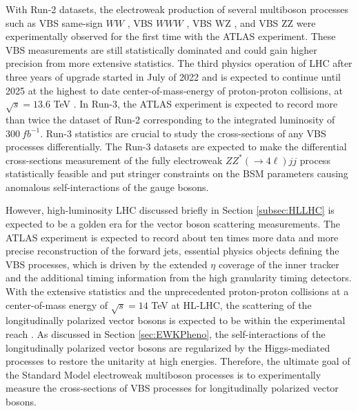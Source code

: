 With Run-2 datasets, the electroweak production of several multiboson processes such as VBS same-sign $WW$ \cite{EWk_ssWW}, VBS $WWW$ \cite{EWK_WWW}, VBS WZ \cite{EWK_WZ}, and VBS ZZ \cite{ATLASZZjj} were experimentally observed for the first time with the ATLAS experiment. These VBS measurements are still statistically dominated and could gain higher precision from more extensive statistics. The third physics operation of LHC after three years of upgrade started in July of 2022 and is expected to continue until 2025 at the highest to date center-of-mass-energy of proton-proton collisions, at $\sqrt{s}=13.6$ TeV \cite{Run3}. In Run-3, the ATLAS experiment is expected to record more than twice the dataset of Run-2 corresponding to the integrated luminosity of $300 ~fb^{-1}$. Run-3 statistics are crucial to study the cross-sections of any VBS processes differentially. The Run-3 datasets are expected to make the differential cross-sections measurement of the fully electroweak $ZZ^*(\rightarrow 4\ell) jj$ process statistically feasible and put stringer constraints on the BSM parameters causing anomalous self-interactions of the gauge bosons. 

However, high-luminosity LHC discussed briefly in Section \ref{subsec:HLLHC} is expected to be a golden era for the vector boson scattering measurements. The ATLAS experiment is expected to record about ten times more data and more precise reconstruction of the forward jets, essential physics objects defining the VBS processes, which is driven by the extended $\eta$ coverage of the inner tracker and the additional timing information from the high granularity timing detectors. With the extensive statistics and the unprecedented proton-proton collisions at a center-of-mass energy of $\sqrt{s}=14$ TeV at HL-LHC, the scattering of the longitudinally polarized vector bosons is expected to be within the experimental reach \cite{ssWW_HLLHCProspects}. As discussed in Section \ref{sec:EWKPheno}, the self-interactions of the longitudinally polarized vector bosons are regularized by the Higgs-mediated processes to restore the unitarity at high energies. Therefore, the ultimate goal of the Standard Model electroweak multiboson processes is to experimentally measure the cross-sections of VBS processes for longitudinally polarized vector bosons.